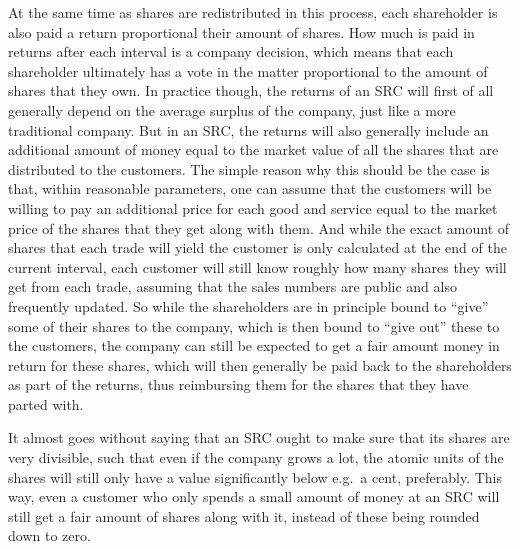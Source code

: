 \documentclass{article}
\begin{document}
At the same time as shares are redistributed in this process, each shareholder is also paid a return proportional their amount of shares. How much is paid in returns after each interval is a company decision, which means that each shareholder ultimately has a vote in the matter proportional to the amount of shares that they own. 
In practice though, the returns of an SRC will first of all generally depend on the average surplus of the company, just like a more traditional company. But in an SRC, the returns will also generally include an additional amount of money equal to the market value of all the shares that are distributed to the customers.
The simple reason why this should be the case is that, within reasonable parameters, one can assume that the customers will be willing to pay an additional price for each good and service equal to the market price of the shares that they get along with them. And while the exact amount of shares that each trade will yield the customer is only calculated at the end of the current interval, each customer will still know roughly how many shares they will get from each trade, assuming that the sales numbers are public and also frequently updated. 
So while the shareholders are in principle bound to ``give'' some of their shares to the company, which is then bound to ``give out'' these to the customers, the company can still be expected to get a fair amount money in return for these shares, which will then generally be paid back to the shareholders as part of the returns, thus reimbursing them for the shares that they have parted with. 


It almost goes without saying that an SRC ought to make sure that its shares are very divisible, such that even if the company grows a lot, the atomic units of the shares will still only have a value significantly below e.g.\ a cent, preferably. 
This way, even a customer who only spends a small amount of money at an SRC will still get a fair amount of shares along with it, instead of these being rounded down to zero.


\end{document}
